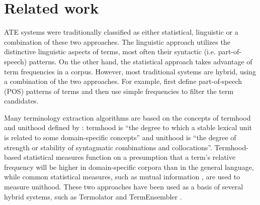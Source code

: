 \section{Related work}
\label{sec:related}

ATE systems were traditionally classified as either statistical, linguistic or a combination of these two approaches. The linguistic approach utilizes the distinctive linguistic aspects of terms, most often their syntactic (i.e. part-of-speech) patterns. On the other hand, the statistical approach takes advantage of term frequencies in a corpus. However, most traditional systems are hybrid, using a combination of the two approaches. For example, \cite{justeson1995technical} first define part-of-speech (POS) patterns of terms and then use simple frequencies to filter the term candidates.  

Many terminology extraction algorithms are based on the concepts of term\-hood and unit\-hood defined by \cite{kageura1996methods}: termhood is “the degree to which a stable lexical unit is related to some domain-specific concepts” and unithood is “the degree of strength or stability of syntagmatic combinations and collocations”. Termhood-based statistical measures \citep{vintar2010bilingual} function on a presumption that a term’s relative frequency will be higher in domain-specific corpora than in the general language, while common statistical measures, such as mutual information \citep{daille1994towards}, are used to measure unithood. These two approaches have been used as a basis of several hybrid systems, such as Termolator \citep{meyers2018termolator} and TermEnsembler \citep{repar2019termensembler}.

